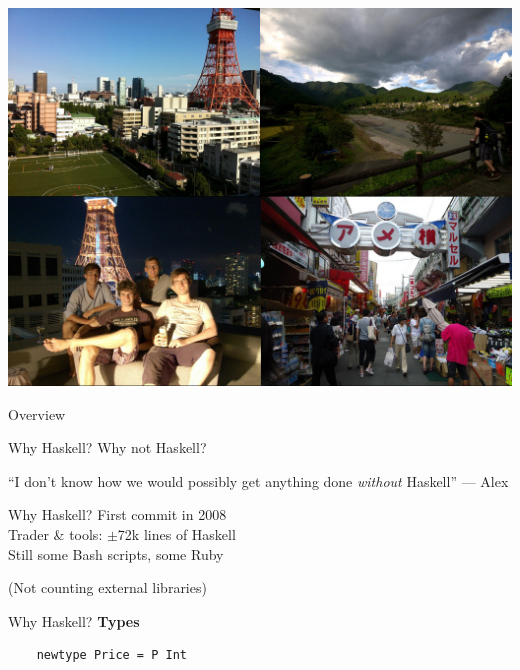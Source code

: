 \documentclass[20pt]{beamer}
\newcommand{\vspaced}{
    \vspace{5mm}
}
\begin{document}
\begin{frame}[plain]
    \includegraphics[width=\textwidth]{images/random-pics.jpg}
\end{frame}


\begin{frame}{Overview}
\end{frame}

\begin{frame}{Why Haskell?}
    \large{Why not Haskell?}
\end{frame}

\begin{frame}
    ``I don't know how we would possibly get anything done
    \emph{without} Haskell'' --- Alex
\end{frame}

\begin{frame}{Why Haskell?}
    First commit in 2008 \\
    Trader \& tools: $\pm$72k lines of Haskell \\
    Still some Bash scripts, some Ruby \\
    \vspaced
    (Not counting external libraries) \\
\end{frame}

\begin{frame}[fragile]{Why Haskell?}
    \textbf{Types} \\
    \vspaced
    \begin{lstlisting}
    newtype Price = P Int
    \end{lstlisting}
\end{frame}
\end{document}
